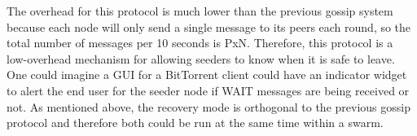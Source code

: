 The overhead for this protocol is much lower than the previous gossip
system because each node will only send a single message to its peers
each round, so the total number of messages per 10 seconds is PxN. Therefore,
this protocol is a low-overhead mechanism for allowing seeders to know when it is safe
to leave. One could imagine a GUI for a BitTorrent client could have an indicator widget
to alert the end user for the seeder node if WAIT messages are being received or not. As
mentioned above, the recovery mode is orthogonal to the previous gossip
protocol and therefore both could be run at the same time within a swarm.
